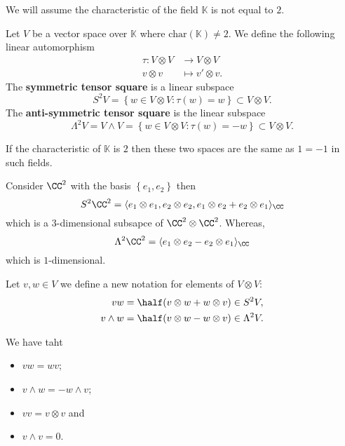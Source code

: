 \documentclass[12pt, a4paper]{article}
\newcommand{\KK}{\mathbb{K}}
\begin{document}
\begin{mdremark}
    We will assume the characteristic of the field \(\KK\) is not equal to \(2\). 
\end{mdremark}

\begin{definition}
    Let \(V\) be a vector space over \(\KK\) where \(\text{char}(\KK)\neq 2\). We define the following linear automorphism  
    \[\begin{aligned}
        \tau: V \otimes V &\to V \otimes V \\
        v\otimes v &\mapsto v'\otimes v.
    \end{aligned}\]
    The \textbf{symmetric tensor square} is a linear subspace 
    \[S^2V  = \left\{ w \in V \otimes V : \tau(w)=w \right\} \subset V\otimes V.\] 
    The \textbf{anti-symmetric tensor square} is the linear subspace 
    \[\Lambda^2 V = V \wedge V= \left\{ w\in V \otimes V : \tau(w)=-w \right\} \subset V \otimes V.\]
\end{definition}

\begin{mdremark}
    If the characteristic of \(\KK\) is \(2\) then these two spaces are the same as \(1=-1\) in such fields.
\end{mdremark}

\begin{mdexample}
    Consider \(\CC^2\) with the basis \(\left\{ e_1,e_2 \right\}\) then 
    \[S^2\CC^2 = \langle e_1\otimes e_1, e_2\otimes e_2, e_1\otimes e_2+e_2\otimes e_1\rangle_{\CC}\]
    which is a \(3\)-dimensional subsapce of \(\CC^2 \otimes \CC^2\).  Whereas,
    \[\Lambda^2\CC^2 = \langle e_1 \otimes e_2-e_2\otimes e_1 \rangle_{\CC}\]
    which is \(1\)-dimensional.
\end{mdexample}

\begin{definition}
    Let \(v,w \in V\) we define a new notation for elements of \(V \otimes V\):
    \[\begin{aligned}
        vw &= \half (v\otimes w+w\otimes v) \in S^2V, \\
        v\wedge w &= \half(v\otimes w-w\otimes v) \in \Lambda^2 V.
    \end{aligned}\]
\end{definition}

\begin{mdprop}
    We have taht 
    \begin{itemize}
        \item \(vw=wv\);
        \item \(v\wedge w = -w\wedge v\);
        \item \(vv=v\otimes v\) and 
        \item \(v \wedge v=0\).
    \end{itemize}
\end{mdprop}
\end{document}
